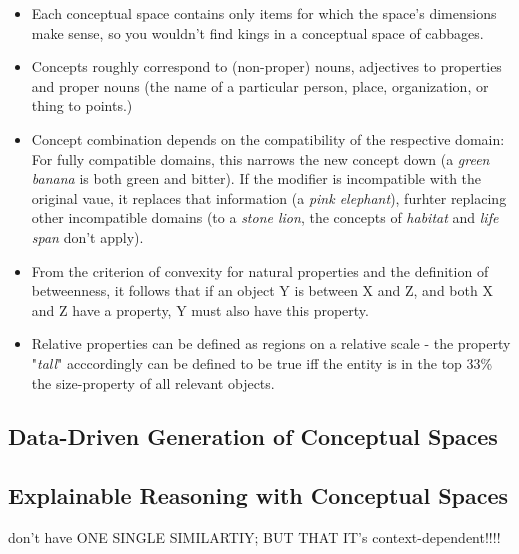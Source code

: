 \begin{itemize}
    \item Each conceptual space contains only items for which the space's dimensions make sense, so you wouldn't find kings in a conceptual space of cabbages.
    \item Concepts roughly correspond to (non-proper) nouns, adjectives to properties and proper nouns (the name of a particular person, place, organization, or thing to points.)
    \item Concept combination depends on the compatibility of the respective domain: For fully compatible domains, this narrows the new concept down (a \textit{green banana} is both green and bitter). If the modifier is incompatible with the original vaue, it replaces that information (\eg a \textit{pink elephant}), furhter replacing other incompatible domains (\eg to a \textit{stone lion}, the concepts of \textit{habitat} and \textit{life span} don't apply).
    \item From the criterion of convexity for natural properties and the definition of betweenness, it follows that if an object Y is between X and Z, and both X and Z have a property, Y must also have this property.
    \item Relative properties can be defined as regions on a relative scale - the property "\textit{tall}" acccordingly can be defined to be true iff the entity is in the top 33\% \wrt the size-property of all relevant objects.
\end{itemize}


\subsection{Data-Driven Generation of Conceptual Spaces}


\subsection{Explainable Reasoning with Conceptual Spaces}
\label{sec:reasoning}

 don't have ONE SINGLE SIMILARTIY; BUT THAT IT's context-dependent!!!!

